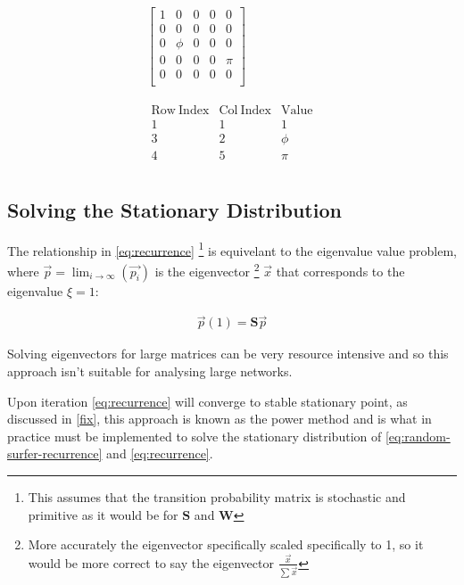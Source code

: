 \documentclass[11pt]{article}
\begin{document}
\begin{align}
    \begin{bmatrix}
	1 & 0 & 0 & 0 & 0 \\
	0 & 0 & 0 & 0 & 0 \\
	0 & \phi & 0 & 0 & 0 \\
	0 & 0 & 0 & 0 & \pi \\
	0 & 0 & 0 & 0 & 0 \\
    \end{bmatrix}  \label{eq:ordinary} \\
    \ \nonumber \\
    \ \nonumber \\
    \begin{matrix}
	\mathrm{Row\ Index} & \mathrm{Col\ Index} & \mathrm{Value}\\
	1 & 1 & 1 \\
	3 & 2 & \phi \\
	4 & 5 & \pi \\
    \end{matrix}  \label{eq:crc}
\end{align}


\subsection{Solving the Stationary Distribution}
\label{solving-stationary-dist}
The relationship in \eqref{eq:recurrence} \footnote{This assumes that the transition
probability matrix is stochastic and primitive as it would be for \(\mathbf{S}\)
and \(\mathbf{W}\)} is equivelant to the eigenvalue value problem, where
\(\vec{p} = \lim_{i \rightarrow \infty} \left( \vec{p_{i}}\right)\) is the
eigenvector \footnote{More accurately the eigenvector specifically scaled
specifically to 1, so it would be more correct to say the eigenvector
\(\frac{\vec{x}}{\sum \vec{x}}\)} \(\vec{x}\) that corresponds to the
eigenvalue \(\xi=1\):

\begin{align}
\vec{p} (1) = \mathbf{S} \vec{p} \label{eq:eigenprob}
\end{align}

Solving eigenvectors for large matrices can be very resource intensive and so
this approach isn't suitable for analysing large networks.

Upon iteration \eqref{eq:recurrence} will converge to stable stationary point, as discussed
in \ref{fix}, this approach is known as the power method
\cite{larsonElementaryLinearAlgebra1991a} and is what in practice must be
implemented to solve the stationary distribution of
\eqref{eq:random-surfer-recurrence} and \eqref{eq:recurrence}.
\end{document}
